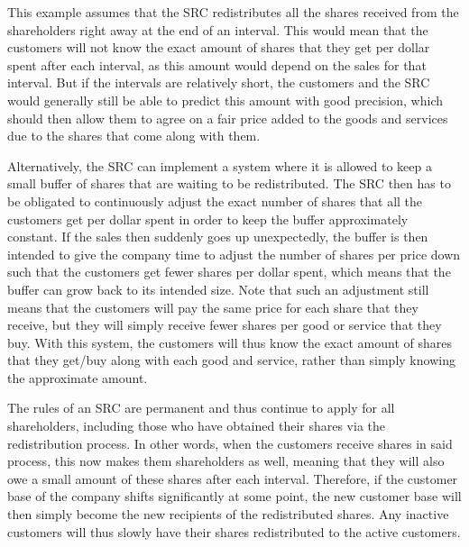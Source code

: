 \documentclass{article}
\begin{document}
This example assumes that the SRC redistributes all the shares received from the shareholders right away at the end of an interval. This would mean that the customers will not know the exact amount of shares that they get per dollar spent after each interval, as this amount would depend on the sales for that interval. But if the intervals are relatively short, the customers and the SRC would generally still be able to predict this amount with good precision, which should then allow them to agree on a fair price added to the goods and services due to the shares that come along with them. 

Alternatively, the SRC can implement a system where it is allowed to keep a small buffer of shares that are waiting to be redistributed. The SRC then has to be obligated to continuously adjust the exact number of shares that all the customers get per dollar spent in order to keep the buffer approximately constant. If the sales then suddenly goes up unexpectedly, the buffer is then intended to give the company time to adjust the number of shares per price down such that the customers get fewer shares per dollar spent, which means that the buffer can grow back to its intended size. Note that such an adjustment still means that the customers will pay the same price for each share that they receive, but they will simply receive fewer shares per good or service that they buy. With this system, the customers will thus know the exact amount of shares that they get/buy along with each good and service, rather than simply knowing the approximate amount. 



The rules of an SRC are permanent and thus continue to apply for all shareholders, including those who have obtained their shares via the redistribution process. In other words, when the customers receive shares in said process, this now makes them shareholders as well, meaning that they will also owe a small amount of these shares after each interval. 
Therefore, if the customer base of the company shifts significantly at some point, the new customer base will then simply become the new recipients of the redistributed shares. Any inactive customers will thus slowly have their shares redistributed to the active customers.
\end{document}
